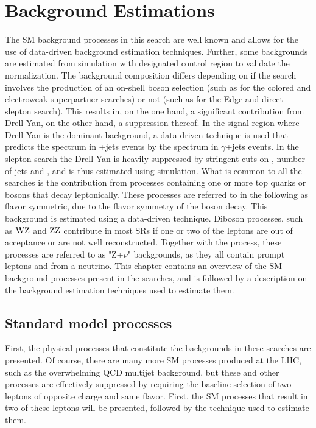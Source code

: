 \chapter{Background Estimations}\label{sec:backgrounds}
\noindent\justify
The SM background processes in this search are well known and allows for the use of data-driven background estimation techniques. 
Further, some backgrounds are estimated from simulation with designated control region to validate the normalization. 
\newpara
\noindent\justify
The background composition differs depending on if the search involves the production of an on-shell \PZ boson selection (such as for the colored and electroweak superpartner searches) or not (such as for the Edge and direct slepton search). 
This results in, on the one hand, a significant contribution from Drell-Yan, on the other hand, a suppression thereof. 
In the signal region where Drell-Yan is the dominant background, a data-driven technique is used that predicts the \ptmiss spectrum in \PZ+jets events by the \ptmiss spectrum in $\gamma$+jets events.
In the slepton search the Drell-Yan is heavily suppressed by stringent cuts on \ptmiss, number of jets and \mttwo, and is thus estimated using simulation.  
What is common to all the searches is the contribution from processes containing one or more top quarks or \PW bosons that decay leptonically. 
These processes are referred to in the following as flavor symmetric, due to the flavor symmetry of the \PW boson decay. 
This background is estimated using a data-driven technique. 
Diboson processes, such as $\mathrm{WZ}$ and $\mathrm{ZZ}$ contribute in most SRs if one or two of the leptons are out of acceptance or are not well reconstructed. 
Together with the \ttZ process, these processes are referred to as "Z+$\nu$" backgrounds, as they all contain prompt leptons and \ptmiss from a neutrino.   
\newpara
\noindent\justify
This chapter contains an overview of the SM background processes present in the searches, and is followed by a description on the background estimation techniques used to estimate them. 
\newpage
\section{Standard model processes}
\noindent\justify
First, the physical processes that constitute the backgrounds in these searches are presented. 
Of course, there are many more SM processes produced at the LHC, such as the overwhelming QCD multijet background, but these and other processes are effectively suppressed by requiring the baseline selection of two leptons of opposite charge and same flavor. 
First, the SM processes that result in two of these leptons will be presented, followed by the technique used to estimate them. 
